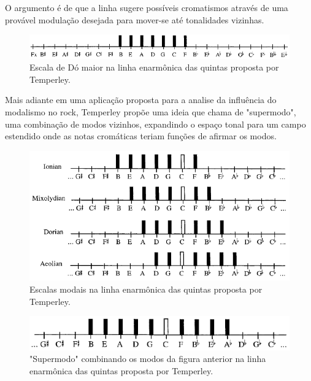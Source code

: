 \documentclass[
	12pt,				%
	openright,			%
	twoside,			%
	a4paper,			%
	english,			%
	french,				%
	spanish,			%
	brazil				%
	]{abntex2}
\begin{document}
O argumento é de que a linha sugere possíveis cromatismos através de uma provável modulação desejada para mover-se até tonalidades vizinhas.

\begin{figure}[!h]
	\caption{\label{fig_grafico}Escala de Dó maior na linha enarmônica das quintas proposta por Temperley. }
	\begin{center}
	    \includegraphics[scale=0.6]{CBMS/jonico_lineoffifths.png}
	\end{center}
\end{figure}

Mais adiante em uma aplicação proposta para a analise da influência do modalismo no rock, Temperley propõe uma ideia que chama de "supermodo", uma combinação de modos vizinhos, expandindo o espaço tonal para um campo estendido onde as notas cromáticas teriam funções de afirmar os modos.

\begin{figure}[!h]
	\caption{\label{fig_grafico}Escalas modais na linha enarmônica das quintas proposta por Temperley. }
	\begin{center}
	    \includegraphics[scale=0.6]{CBMS/modosrockgregos_temperley.png}
	\end{center}
\end{figure}




\begin{figure}[!h]
	\caption{\label{fig_grafico}"Supermodo" combinando os modos da figura anterior na linha enarmônica das quintas proposta por Temperley. }
	\begin{center}
	    \includegraphics[scale=0.6]{CBMS/supermodo_temperley.png}
	\end{center}
\end{figure}
\end{document}
